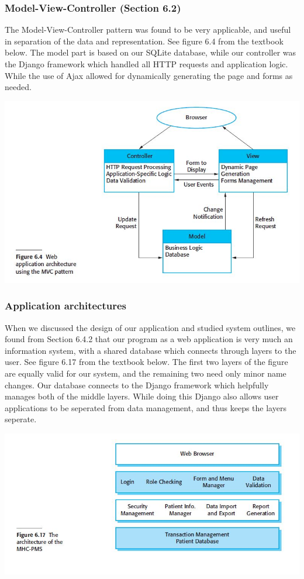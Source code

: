 \documentclass[11pt]{article}
\begin{document}
	\subsubsection{Model-View-Controller (Section 6.2)}
		The Model-View-Controller pattern was found to be very applicable, and useful in separation of the data and representation. 
		See figure 6.4 from the textbook below. 
		The model part is based on our SQLite database, while our controller was the Django framework which handled all HTTP requests and application logic. 
		While the use of Ajax allowed for dynamically generating the page and forms as needed. \\
		\centerline{\includegraphics[scale=0.5]{./images/MVC.JPG}}
	\subsubsection{Application architectures}
		When we discussed the design of our application and studied system outlines, we found from Section 6.4.2 that our program as a web application is very much an information system, with a shared database which connects through layers to the user. 
		See figure 6.17 from the textbook below. 
		The first two layers of the figure are equally valid for our system, and the remaining two need only minor name changes. 
		Our database connects to the Django framework which helpfully manages both of the middle layers.
		While doing this Django also allows user applications to be seperated from data management, and thus keeps the layers seperate. \\

                
		\centerline{\includegraphics[scale=0.5]{./images/TPIS.JPG}}
\end{document}
